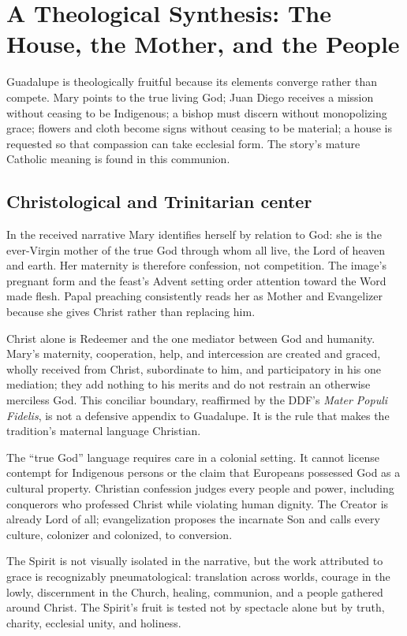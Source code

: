 \section{A Theological Synthesis: The House, the Mother, and the People}

Guadalupe is theologically fruitful because its elements converge rather than compete. Mary points to the true living God; Juan Diego receives a mission without ceasing to be Indigenous; a bishop must discern without monopolizing grace; flowers and cloth become signs without ceasing to be material; a house is requested so that compassion can take ecclesial form. The story's mature Catholic meaning is found in this communion.

\subsection{Christological and Trinitarian center}

In the received narrative Mary identifies herself by relation to God: she is the ever-Virgin mother of the true God through whom all live, the Lord of heaven and earth. Her maternity is therefore confession, not competition. The image's pregnant form and the feast's Advent setting order attention toward the Word made flesh. Papal preaching consistently reads her as Mother and Evangelizer because she gives Christ rather than replacing him.

Christ alone is Redeemer and the one mediator between God and humanity. Mary's maternity, cooperation, help, and intercession are created and graced, wholly received from Christ, subordinate to him, and participatory in his one mediation; they add nothing to his merits and do not restrain an otherwise merciless God. This conciliar boundary, reaffirmed by the DDF's \emph{Mater Populi Fidelis}, is not a defensive appendix to Guadalupe. It is the rule that makes the tradition's maternal language Christian.

The “true God” language requires care in a colonial setting. It cannot license contempt for Indigenous persons or the claim that Europeans possessed God as a cultural property. Christian confession judges every people and power, including conquerors who professed Christ while violating human dignity. The Creator is already Lord of all; evangelization proposes the incarnate Son and calls every culture, colonizer and colonized, to conversion.

The Spirit is not visually isolated in the narrative, but the work attributed to grace is recognizably pneumatological: translation across worlds, courage in the lowly, discernment in the Church, healing, communion, and a people gathered around Christ. The Spirit's fruit is tested not by spectacle alone but by truth, charity, ecclesial unity, and holiness.

